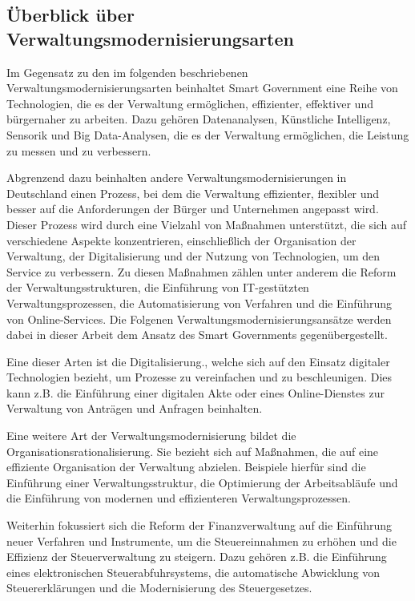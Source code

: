 \subsection{Überblick über Verwaltungsmodernisierungsarten}
Im Gegensatz zu den im folgenden beschriebenen Verwaltungsmodernisierungsarten beinhaltet Smart Government eine Reihe von Technologien, die es der Verwaltung ermöglichen, effizienter, effektiver und bürgernaher zu arbeiten. 
Dazu gehören Datenanalysen, Künstliche Intelligenz, Sensorik und Big Data-Analysen, die es der Verwaltung ermöglichen, die Leistung zu messen und zu verbessern.
\par
Abgrenzend dazu beinhalten andere Verwaltungsmodernisierungen in Deutschland einen Prozess, bei dem die Verwaltung effizienter, flexibler und besser auf die Anforderungen der Bürger und Unternehmen angepasst wird. 
Dieser Prozess wird durch eine Vielzahl von Maßnahmen unterstützt, die sich auf verschiedene Aspekte konzentrieren, einschließlich der Organisation der Verwaltung, der Digitalisierung und der Nutzung von Technologien, um den Service zu verbessern. 
Zu diesen Maßnahmen zählen unter anderem die Reform der Verwaltungsstrukturen, die Einführung von IT-gestützten Verwaltungsprozessen, die Automatisierung von Verfahren und die Einführung von Online-Services.
Die Folgenen Verwaltungsmodernisierungsansätze werden dabei in dieser Arbeit dem Ansatz des Smart Governments gegenübergestellt.
\par
Eine dieser Arten ist die Digitalisierung., welche sich auf den Einsatz digitaler Technologien bezieht, um Prozesse zu vereinfachen und zu beschleunigen. 
Dies kann z.B. die Einführung einer digitalen Akte oder eines Online-Dienstes zur Verwaltung von Anträgen und Anfragen beinhalten.
\par
Eine weitere Art der Verwaltungsmodernisierung bildet die Organisationsrationalisierung.
Sie bezieht sich auf Maßnahmen, die auf eine effiziente Organisation der Verwaltung abzielen.
Beispiele hierfür sind die Einführung einer Verwaltungsstruktur, die Optimierung der Arbeitsabläufe und die Einführung von modernen und effizienteren Verwaltungsprozessen.
\par
Weiterhin fokussiert sich die Reform der Finanzverwaltung auf die Einführung neuer Verfahren und Instrumente, um die Steuereinnahmen zu erhöhen und die Effizienz der Steuerverwaltung zu steigern. 
Dazu gehören z.B. die Einführung eines elektronischen Steuerabfuhrsystems, die automatische Abwicklung von Steuererklärungen und die Modernisierung des Steuergesetzes.
\par
